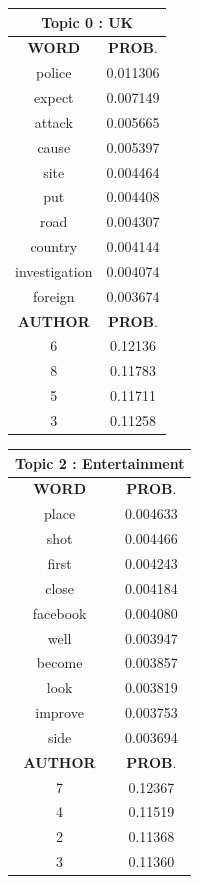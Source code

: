\begin{table}[h!]
\centering
\begin{tabular}{|c c|} 
\hline
\multicolumn{2}{|c|}{\textbf{Topic 0 : UK}} \\
\hline
 \textbf{WORD} & \textbf{PROB}.  \\ [0.3ex] 
 \hline
 	police  &   0.011306\\
	expect   &  0.007149\\
	attack  &   0.005665\\
	cause  &   0.005397\\
	site  &   0.004464\\
	put   &  0.004408\\
	road   &  0.004307\\
	country  &   0.004144\\
	investigation  &   0.004074\\
	foreign   &  0.003674\\[1ex] 
 \hline
  \textbf{AUTHOR} & \textbf{PROB}.  \\ [0.3ex] 
 \hline
 6  & 0.12136\\
8  &   0.11783\\
5  &   0.11711\\
3  &   0.11258\\
 \hline
\end{tabular}
 \hfill
\begin{tabular}{|c c|} 
\hline
\multicolumn{2}{|c|}{\textbf{Topic 2 : Entertainment}} \\
\hline
 \textbf{WORD} & \textbf{PROB}.  \\ [0.3ex] 
 \hline
 	place  & 0.004633 \\
 	shot   & 0.004466\\
	first  &  0.004243\\
	close  &  0.004184\\
	facebook  &  0.004080\\
	well   &    0.003947\\
	become    &   0.003857\\
	look   &    0.003819\\
	improve   &    0.003753\\
	side    &   0.003694\\[1ex] 
 \hline
  \textbf{AUTHOR} & \textbf{PROB}.  \\ [0.3ex] 
 \hline
 7  & 0.12367\\
4   &  0.11519\\
2  &   0.11368\\
3  &   0.11360\\

\end{tabular}
\end{table}
